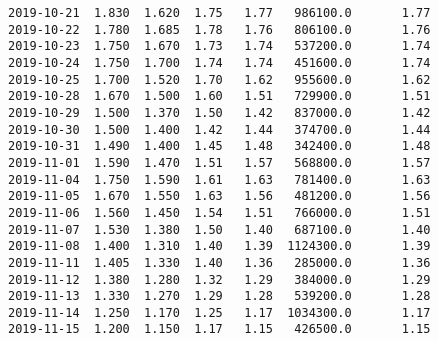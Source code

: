 \documentclass[11pt]{article}
\begin{document}
\begin{Verbatim}[commandchars=\\\{\}]
2019-10-21  1.830  1.620  1.75   1.77   986100.0       1.77
2019-10-22  1.780  1.685  1.78   1.76   806100.0       1.76
2019-10-23  1.750  1.670  1.73   1.74   537200.0       1.74
2019-10-24  1.750  1.700  1.74   1.74   451600.0       1.74
2019-10-25  1.700  1.520  1.70   1.62   955600.0       1.62
2019-10-28  1.670  1.500  1.60   1.51   729900.0       1.51
2019-10-29  1.500  1.370  1.50   1.42   837000.0       1.42
2019-10-30  1.500  1.400  1.42   1.44   374700.0       1.44
2019-10-31  1.490  1.400  1.45   1.48   342400.0       1.48
2019-11-01  1.590  1.470  1.51   1.57   568800.0       1.57
2019-11-04  1.750  1.590  1.61   1.63   781400.0       1.63
2019-11-05  1.670  1.550  1.63   1.56   481200.0       1.56
2019-11-06  1.560  1.450  1.54   1.51   766000.0       1.51
2019-11-07  1.530  1.380  1.50   1.40   687100.0       1.40
2019-11-08  1.400  1.310  1.40   1.39  1124300.0       1.39
2019-11-11  1.405  1.330  1.40   1.36   285000.0       1.36
2019-11-12  1.380  1.280  1.32   1.29   384000.0       1.29
2019-11-13  1.330  1.270  1.29   1.28   539200.0       1.28
2019-11-14  1.250  1.170  1.25   1.17  1034300.0       1.17
2019-11-15  1.200  1.150  1.17   1.15   426500.0       1.15


\end{Verbatim}
\end{document}
